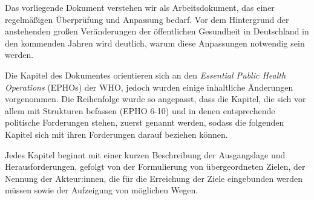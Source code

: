 \documentclass{article}
\begin{document}
Das vorliegende Dokument verstehen wir als Arbeitsdokument, das einer regelmäßigen Überprüfung und Anpassung bedarf. Vor dem Hintergrund der anstehenden großen Veränderungen der öffentlichen Gesundheit in Deutschland in den kommenden Jahren wird deutlich, warum diese Anpassungen notwendig sein werden.


Die Kapitel des Dokumentes orientieren sich an den \emph{Essential Public Health Operations} (EPHOs) der WHO, jedoch wurden einige inhaltliche Änderungen vorgenommen. Die Reihenfolge wurde so angepasst, dass die Kapitel, die sich vor allem mit Strukturen befassen (EPHO 6-10) und in denen entsprechende politische Forderungen stehen, zuerst genannt werden, sodass die folgenden Kapitel sich mit ihren Forderungen darauf beziehen können.


Jedes Kapitel beginnt mit einer kurzen Beschreibung der Ausgangslage und Herausforderungen, gefolgt von der Formulierung von übergeordneten Zielen, der Nennung der Akteur:innen, die für die Erreichung der Ziele eingebunden werden müssen sowie der Aufzeigung von möglichen Wegen.
\end{document}
